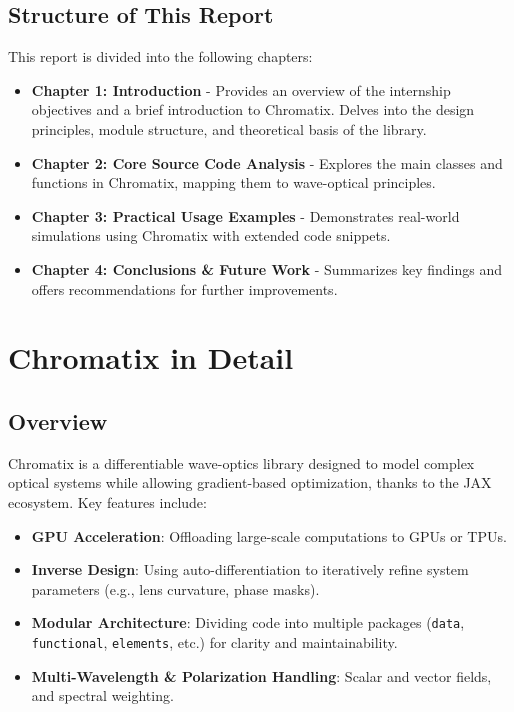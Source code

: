 \documentclass[a4paper,12pt]{report}
\begin{document}
\section{Structure of This Report}
This report is divided into the following chapters:
\begin{itemize}
    \item \textbf{Chapter 1: Introduction} - Provides an overview of the internship objectives and a brief introduction to Chromatix. Delves into the design principles, module structure, and theoretical basis of the library.
    \item \textbf{Chapter 2: Core Source Code Analysis} - Explores the main classes and functions in Chromatix, mapping them to wave-optical principles.
    \item \textbf{Chapter 3: Practical Usage Examples} - Demonstrates real-world simulations using Chromatix with extended code snippets.
    \item \textbf{Chapter 4: Conclusions \& Future Work} - Summarizes key findings and offers recommendations for further improvements.
\end{itemize}

\chapter{Chromatix in Detail}
\section{Overview}
Chromatix is a differentiable wave-optics library designed to model complex optical systems while allowing gradient-based optimization, thanks to the JAX ecosystem. Key features include:
\begin{itemize}
    \item \textbf{GPU Acceleration}: Offloading large-scale computations to GPUs or TPUs.
    \item \textbf{Inverse Design}: Using auto-differentiation to iteratively refine system parameters (e.g., lens curvature, phase masks).
    \item \textbf{Modular Architecture}: Dividing code into multiple packages (\texttt{data}, \texttt{functional}, \texttt{elements}, etc.) for clarity and maintainability.
    \item \textbf{Multi-Wavelength \& Polarization Handling}: Scalar and vector fields, and spectral weighting.
\end{itemize}
\end{document}
